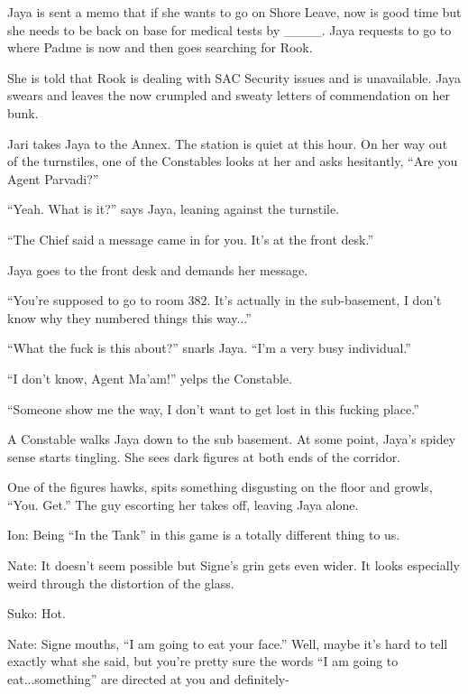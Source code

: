 
Jaya is sent a memo that if she wants to go on Shore Leave, now is good time but she needs to be back on base for medical tests by \_\_\_\_.  Jaya requests to go to where Padme is now and then goes searching for Rook.

She is told that Rook is dealing with SAC Security issues and is unavailable.  Jaya swears and leaves the now crumpled and sweaty letters of commendation on her bunk.



Jari takes Jaya to the Annex. The station is quiet at this hour. On her way out of the turnstiles, one of the Constables looks at her and asks hesitantly, ``Are you Agent Parvadi?''

``Yeah.  What is it?'' says Jaya, leaning against the turnstile. 

``The Chief said a message came in for you.  It's at the front desk.''

Jaya goes to the front desk and demands her message.

``You're supposed to go to room 382.  It's actually in the sub-basement, I don't know why they numbered things this way...''

``What the fuck is this about?'' snarls Jaya.  ``I'm a very busy individual.''

``I don't know, Agent Ma'am!'' yelps the Constable.

``Someone show me the way, I don't want to get lost in this fucking place.''

A Constable walks Jaya down to the sub basement.  At some point, Jaya's spidey sense starts tingling.  She sees dark figures at both ends of the corridor.

One of the figures hawks, spits something disgusting on the floor and growls, ``You.  Get.'' The guy escorting her takes off, leaving Jaya alone.







Ion: Being ``In the Tank'' in this game is a totally different thing to us.



Nate: It doesn't seem possible but Signe's grin gets even wider.  It looks especially weird through the distortion of the glass.

Suko: Hot.



Nate: Signe mouths,  ``I am going to eat your face.''  Well, maybe it's hard to tell exactly what she said, but you're pretty sure the words ``I am going to eat...something'' are directed at you and definitely-

